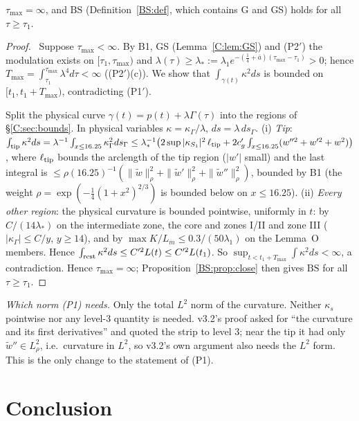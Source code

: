 \documentclass[11pt]{article}
\begin{document}
\begin{proposition}\label{C:prop:global}
$\tau_{\max}=\infty$, and $\mathrm{BS}$ (Definition~\ref{BS:def}, which contains G and GS) holds for all $\tau\ge\tau_1$.
\end{proposition}
\begin{proof}\tP\ Suppose $\tau_{\max}<\infty$. By B1, GS (Lemma~\ref{C:lem:GS}) and (P2$'$) the modulation exists on $[\tau_1,\tau_{\max})$ and $\lambda(\tau)\ge\lambda_*:=\lambda_1e^{-(\frac14+\bar a)(\tau_{\max}-\tau_1)}>0$; hence $T_{\max}=\int_{\tau_1}^{\tau_{\max}}\lambda^4d\tau<\infty$ ((P2$'$)(c)). We show that $\int_{\gamma(t)}\kappa^2ds$ is bounded on $[t_1,t_1+T_{\max})$, contradicting (P1$'$).

Split the physical curve $\gamma(t)=p(t)+\lambda\Gamma(\tau)$ into the regions of \S\ref{C:sec:bounds}. In physical variables $\kappa=\kappa_\Gamma/\lambda$, $ds=\lambda\,ds_\Gamma$.
(i) \emph{Tip}: $\int_{\rm tip}\kappa^2ds=\lambda^{-1}\int_{x\le16.25}\kappa_\Gamma^2ds_\Gamma\le\lambda_*^{-1}\bigl(2\sup|\kappa_{S_1}|^2\,\ell_{\rm tip}+2c_g'\int_{x\le16.25}(w''^2+w'^2+w^2)\bigr)$, where $\ell_{\rm tip}$ bounds the arclength of the tip region ($|w'|$ small) and the last integral is $\le\rho(16.25)^{-1}(\|\tilde w\|_\rho^2+\|\tilde w'\|_\rho^2+\|\tilde w''\|_\rho^2)$, bounded by B1 (the weight $\rho=\exp(-\frac14(1+x^2)^{2/3})$ is bounded below on $x\le16.25$).
(ii) \emph{Every other region}: the physical curvature is bounded pointwise, uniformly in $t$: by $C/(14\lambda_*)$ on the intermediate zone, the core and zones I/II and zone III ($|\kappa_\Gamma|\le C/y$, $y\ge14$), and by $\max K/L_m\le0.3/(50\lambda_1)$ on the Lemma~O members. Hence $\int_{\rm rest}\kappa^2ds\le C'^2L(t)\le C'^2L(t_1)$.
So $\sup_{t<t_1+T_{\max}}\int\kappa^2ds<\infty$, a contradiction. Hence $\tau_{\max}=\infty$; Proposition~\ref{BS:prop:close} then gives $\mathrm{BS}$ for all $\tau\ge\tau_1$.
\end{proof}
\noindent\emph{Which norm (P1) needs.} Only the total $L^2$ norm of the curvature. Neither $\kappa_s$ pointwise nor any level-3 quantity is needed. v3.2's proof asked for ``the curvature and its first derivatives'' and quoted the strip to level 3; near the tip it had only $\tilde w''\in L^2_\rho$, i.e.\ curvature in $L^2$, so v3.2's own argument also needs the $L^2$ form. This is the only change to the statement of (P1).

\section{Conclusion}\label{C:sec:concl}
\end{document}
